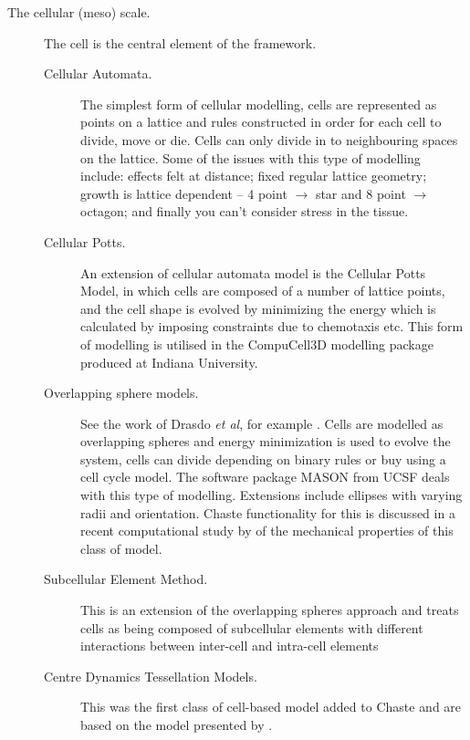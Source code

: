 \documentclass[a4paper,12pt]{article}
\begin{document}
\begin{description}
\item [The cellular (meso) scale.] {The cell is the central element of the framework.} 

    \begin{description}
	    \item [Cellular Automata.]{ The simplest form of cellular modelling,
    cells are represented as points on a lattice and rules constructed in order for
    each cell to divide, move or die. Cells can only divide in to neighbouring spaces
    on the lattice. Some of the issues with this type of modelling include: effects felt at distance; 
    fixed regular lattice
    geometry; growth is lattice dependent -- 4 point $\rightarrow$ star and 8 point
    $\rightarrow$ octagon; and finally you can't consider stress in the tissue.}

	    \item [Cellular Potts.]{An extension of cellular automata model is the
    Cellular Potts Model, in which cells are composed of a number of lattice points, and
    the cell shape is evolved by minimizing the energy which is calculated by
    imposing constraints due to chemotaxis etc. This form of modelling is utilised
    in the CompuCell3D modelling package produced at Indiana University.}

	    \item [Overlapping sphere models.]
	    {See the work of Drasdo \emph{et al}, for example \citep{Drasdo2007Role}.
    Cells are modelled as overlapping spheres and energy minimization is used to
    evolve the system, cells can divide depending on binary rules or buy using a
    cell cycle model. The software package MASON from UCSF deals with this type of modelling. 
    Extensions include ellipses with varying radii and orientation. 
    Chaste functionality for this is discussed in a recent computational study by 
    \citet{Pathmanathan2009Computational} of the mechanical properties of this class of model.}

	    \item [Subcellular Element Method.]{This is an extension of the
    overlapping spheres approach and treats cells as being composed of subcellular
    elements with different interactions between inter-cell and intra-cell elements 
    \citep{Newman2005Modeling,Sandersius2008Modeling} }

	    \item[Centre Dynamics Tessellation Models.] This was the first class of cell-based model 
	    added to Chaste \citep{Leeuwen2009Integrative} and are based on the model 
	    presented by \citet{Meineke2001Cell}.


\end{description}
\end{description}
\end{document}
